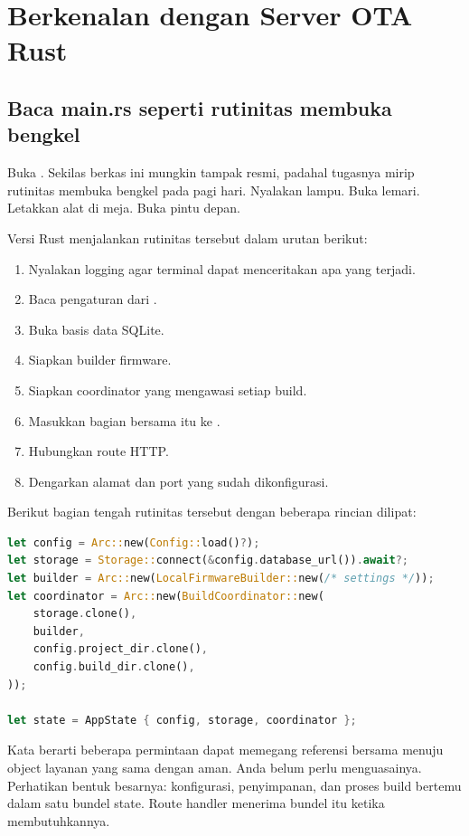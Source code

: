 \chapter{Berkenalan dengan Server OTA Rust}

\section{Baca main.rs seperti rutinitas membuka bengkel}

Buka . Sekilas berkas ini mungkin tampak resmi, padahal tugasnya mirip rutinitas membuka bengkel pada pagi hari. Nyalakan lampu. Buka lemari. Letakkan alat di meja. Buka pintu depan.

Versi Rust menjalankan rutinitas tersebut dalam urutan berikut:

\begin{enumerate}
  \item Nyalakan logging agar terminal dapat menceritakan apa yang terjadi.
  \item Baca pengaturan dari .
  \item Buka basis data SQLite.
  \item Siapkan builder firmware.
  \item Siapkan coordinator yang mengawasi setiap build.
  \item Masukkan bagian bersama itu ke .
  \item Hubungkan route HTTP.
  \item Dengarkan alamat dan port yang sudah dikonfigurasi.
\end{enumerate}

Berikut bagian tengah rutinitas tersebut dengan beberapa rincian dilipat:

\begin{lstlisting}[language=Rust]
let config = Arc::new(Config::load()?);
let storage = Storage::connect(&config.database_url()).await?;
let builder = Arc::new(LocalFirmwareBuilder::new(/* settings */));
let coordinator = Arc::new(BuildCoordinator::new(
    storage.clone(),
    builder,
    config.project_dir.clone(),
    config.build_dir.clone(),
));

let state = AppState { config, storage, coordinator };
\end{lstlisting}

Kata  berarti beberapa permintaan dapat memegang referensi bersama menuju object layanan yang sama dengan aman. Anda belum perlu menguasainya. Perhatikan bentuk besarnya: konfigurasi, penyimpanan, dan proses build bertemu dalam satu bundel state. Route handler menerima bundel itu ketika membutuhkannya.

